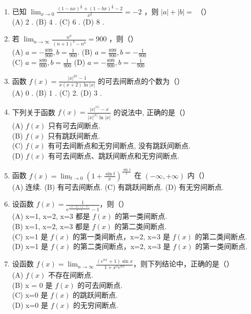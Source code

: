 \documentclass[12pt, a4paper]{ctexart}
\begin{document}
\begin{enumerate}
    \item 已知 $ \lim_{x\to0}\frac{(1-ax)^{\frac{1}{2}}+(1-bx)^{\frac{1}{4}}-2}{x^{2}}=-2 $ ，则 $ \left|a\right|+\left|b\right|= $ （）\\
    (A) 2 . \quad (B) 4 . \quad (C) 6 . \quad (D) 8 .

    \item 若 $ \lim_{n\to\infty}\frac{n^{a}}{\left(n+1\right)^{b}-n^{b}}=900 $ ，则（）\\
    (A) $ a = -\frac{899}{900}, b = \frac{1}{900} $. \quad (B) $ a=\frac{899}{900}, b=-\frac{1}{900} $\\
    (C) $ a=\frac{899}{900}, b=\frac{1}{900} $ \quad (D) $ a = -\frac{899}{900}, b = -\frac{1}{900} $

    \item 函数 $ f(x)=\frac{|x|^{2x}-1}{x(x+2)\ln|x|} $ 的可去间断点的个数为（）\\
    (A) 0 . \quad (B) 1 . \quad (C) 2. \quad (D) 3 .

    \item 下列关于函数 $ f(x)=\frac{|x|^{|x|}-x}{|x|^{|x|}\ln|x|} $ 的说法中, 正确的是（）\\
    (A) $ f(x) $ 只有可去间断点.\\
    (B) $ f(x) $ 只有跳跃间断点.\\
    (C) $ f(x) $ 有可去间断点和无穷间断点, 没有跳跃间断点.\\
    (D) $ f(x) $ 有可去间断点、跳跃间断点和无穷间断点.

    \item 函数 $ f(x)=\lim_{t\to0}\left(1+\frac{\sin t}{x}\right)^{\frac{\sin x}{t}} $ 在 $ (-\infty,+\infty) $ 内（）\\
    (A) 连续. \quad (B) 有可去间断点. \quad (C) 有跳跃间断点. \quad (D) 有无穷间断点.

    \item 设函数 $ f(x)=\frac{1}{\mathrm{e}^{\frac{(x-2)(x-3)}{x-1}}-1} $，则（）\\
    (A) x=1, x=2, x=3 都是 $ f(x) $ 的第一类间断点.\\
    (B) x=1, x=2, x=3 都是 $ f(x) $ 的第二类间断点.\\
    (C) x=1 是 $ f(x) $ 的第一类间断点，x=2, x=3 是 $ f(x) $ 的第二类间断点.\\
    (D) x=1 是 $ f(x) $ 的第二类间断点，x=2, x=3 是 $ f(x) $ 的第一类间断点.

    \item 设函数 $ f(x) = \lim_{n \to \infty} \frac{\left(e^{nx} + 1\right) \sin x}{1 + x^3 e^{nx}} $，则下列结论中，正确的是（）\\
    (A) $ f(x) $ 不存在间断点.\\
    (B) x = 0 是 $ f(x) $ 的可去间断点.\\
    (C) x=0 是 $ f(x) $ 的跳跃间断点.\\
    (D) x=0 是 $ f(x) $ 的无穷间断点.


\end{enumerate}
\end{document}
